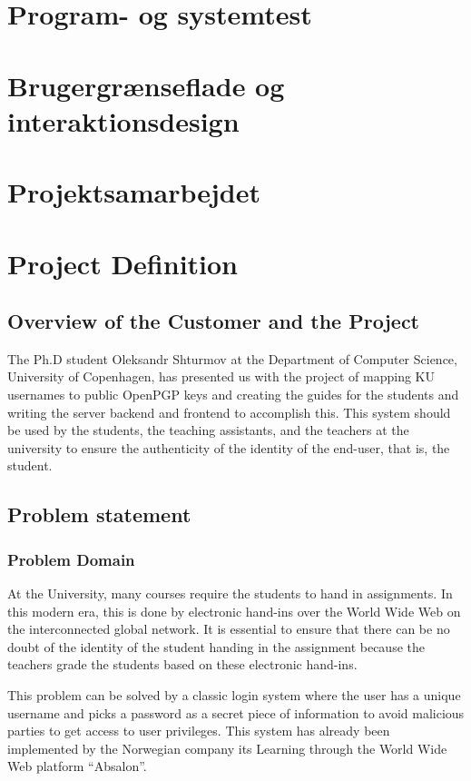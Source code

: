 \documentclass[11pt,a4paper]{report}
\begin{document}
\section{Program- og systemtest}

\section{Brugergrænseflade og interaktionsdesign}

\section{Projektsamarbejdet}

\section{Project Definition}
\subsection{Overview of the Customer and the Project}
The Ph.D student Oleksandr Shturmov at the Department of Computer Science, University of Copenhagen, has presented us with the project of mapping KU usernames to public OpenPGP keys and creating the guides for the students and writing the server backend and frontend to accomplish this. This system should be used by the students, the teaching assistants, and the teachers at the university to ensure the authenticity of the identity of the end-user, that is, the student.
\subsection{Problem statement}
\subsubsection{Problem Domain}
At the University, many courses require the students to hand in assignments. In this modern era, this is done by electronic hand-ins over the World Wide Web on the interconnected global network. It is essential to ensure that there can be no doubt of the identity of the student handing in the assignment because the teachers grade the students based on these electronic hand-ins.

This problem can be solved by a classic login system where the user has a unique username and picks a password as a secret piece of information to avoid malicious parties to get access to user privileges. This system has already been implemented by the Norwegian company its Learning through the World Wide Web platform ``Absalon''.
\end{document}
